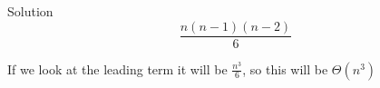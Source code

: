 \documentclass[10pt,letterpaper,unboxed,cm]{article}
\begin{document}
\begin{enumerate}
\begin{enumerate}
\begin{frame}{Solution}
\[\frac{n(n-1)(n-2)}{6}\]

If we look at the leading term it will be \(\frac{n^3}{6}\), so this will be \(\Theta(n^3)\)

\end{frame}


\end{enumerate}







\end{enumerate}
\end{document}
